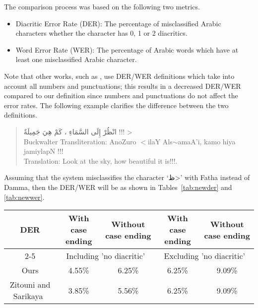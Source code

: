 \documentclass[conference]{IEEEtran}
\begin{document}
The comparison process was based on the following two metrics.
\begin{itemize}
\item Diacritic Error Rate (DER): The percentage of misclassified Arabic characters whether the character has 0, 1 or 2 diacritics.

\item Word Error Rate (WER): The percentage of Arabic words which have at least one misclassified Arabic character.
\end{itemize}
Note that other works, such as \cite{zitouni2009arabic}, use DER/WER definitions which take into account all numbers and punctuations; this results in a decreased DER/WER compared to our definition since numbers and punctuations do not affect the error rates.
The following example clarifies the difference between the two definitions.
\begin{quote}
\centering
\<
انْظُرْ إِلَى السَّمَاءِ ، كَمْ هِيَ جَمِيلَةٌ !!!
> \\
Buckwalter Transliteration: AnoZuro $<$ilaY Als$\sim$amaA'i, kamo hiya jamiylapN !!! \\
Translation: Look at the sky, how beautiful it is!!!.
\end{quote}
Assuming that the system misclassifies the character
`\<ظ>'
with Fatha instead of Damma, then the DER/WER will be as shown in Tables~\ref{tab:newder} and \ref{tab:newwer}.

\begin{table*}
\centering
\caption{Comparison of our definition of DER and the definition of Zitouni and Sarikaya~\cite{zitouni2009arabic}}
\label{tab:newder}
\begin{tabular}{|c|c|c|c|c|}
\hline
\multirow{2}{*}{DER} & With case ending & Without case ending & With case ending & Without case ending \\ \cline{2-5} 
 & \multicolumn{2}{c|}{Including 'no diacritic'} & \multicolumn{2}{c|}{Excluding 'no diacritic'} \\ \hline
Ours
& 4.55\% & 6.25\% & 6.25\% & 9.09\% \\ \hline
Zitouni and Sarikaya~\cite{zitouni2009arabic} & 3.85\% & 5.56\% & 6.25\% & 9.09\% \\ \hline
\end{tabular}
\end{table*}
\end{document}
